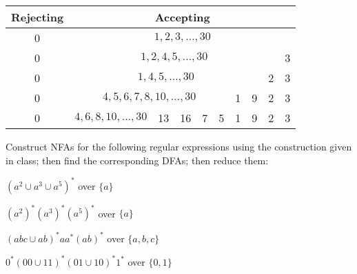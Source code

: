 \begin{solution}
\begin{enumerate}[(a)]
           \begin{center}\begin{tabular}[t]{|c|c|c|c|c|c|c|c|c|c|c|c|c|c|c|c|c|c|c|c|c|c|c|c|c|c|c|c|c|c|c|}\hline
            \multicolumn{1}{|c|}{Rejecting} & \multicolumn{30}{|c|}{Accepting}\\\hline
            \multicolumn{1}{|c|}{0} & \multicolumn{30}{|c|}{$1,2,3,\hdots,30$}\\\hline
            \multicolumn{1}{|c|}{0} & \multicolumn{29}{|c|}{$1,2,4,5,\hdots,30$} & 3\\\hline
            \multicolumn{1}{|c|}{0} & \multicolumn{28}{|c|}{$1,4,5,\hdots,30$} & 2 & 3\\\hline
            \multicolumn{1}{|c|}{0} & \multicolumn{26}{|c|}{$4,5,6,7,8,10,\hdots,30$} & \multicolumn{1}{c|}{1} & \multicolumn{1}{c|}{9} & 2 & 3\\\hline
            \multicolumn{1}{|c|}{0} & \multicolumn{22}{|c|}{$4,6,8,10,\hdots,30$} & \multicolumn{1}{c|}{13} & \multicolumn{1}{c|}{16} & \multicolumn{1}{c|}{7} & \multicolumn{1}{c|}{5} & \multicolumn{1}{c|}{1} & \multicolumn{1}{c|}{9} & 2 & 3\\\hline
            \end{tabular}\end{center}
    \end{enumerate}
\end{solution}

\begin{exercise}{3}
Construct NFAs for the following regular expressions using the construction given in class; then find the corresponding DFAs; then reduce them:
\begin{enumerate}[(a)]
\begin{multicols}{2}
    \item $(a^2 \cup a^3 \cup a^5)^*$ over $\{a\}$
    \item $(a^2)^*(a^3)^*(a^5)^*$ over $\{a\}$
    \item $(abc \cup ab)^*aa^*(ab)^*$ over $\{a, b, c\}$
    \item $0^*(00\cup11)^*(01\cup10)^*1^*$ over $\{0, 1\}$
\end{multicols}
\end{enumerate}
\end{exercise}

